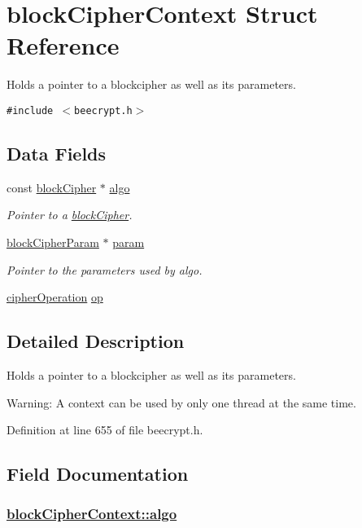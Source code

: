 \hypertarget{structblockCipherContext}{
\section{block\-Cipher\-Context Struct Reference}
\label{structblockCipherContext}
}
Holds a pointer to a blockcipher as well as its parameters.  


{\tt \#include $<$beecrypt.h$>$}

\subsection*{Data Fields}
\begin{CompactItemize}
\item 
const \hyperlink{structblockCipher}{block\-Cipher} $\ast$ \hyperlink{structblockCipherContext_o0}{algo}
\begin{CompactList}\small\item\em Pointer to a \hyperlink{structblockCipher}{block\-Cipher}. \item\end{CompactList}\item 
\hyperlink{group__BC__m_ga1}{block\-Cipher\-Param} $\ast$ \hyperlink{structblockCipherContext_o1}{param}
\begin{CompactList}\small\item\em Pointer to the parameters used by algo. \item\end{CompactList}\item 
\hyperlink{beecrypt_8h_a73}{cipher\-Operation} \hyperlink{structblockCipherContext_o2}{op}
\end{CompactItemize}


\subsection{Detailed Description}
Holds a pointer to a blockcipher as well as its parameters. 

\begin{Desc}
\item[Warning:]A context can be used by only one thread at the same time. \end{Desc}


Definition at line 655 of file beecrypt.h.

\subsection{Field Documentation}
\hypertarget{structblockCipherContext_o0}{
\subsubsection[algo]{\setlength{\rightskip}{0pt plus 5cm}\hyperlink{structblockCipherContext_o0}{block\-Cipher\-Context::algo}}}
\label{structblockCipherContext_o0}


